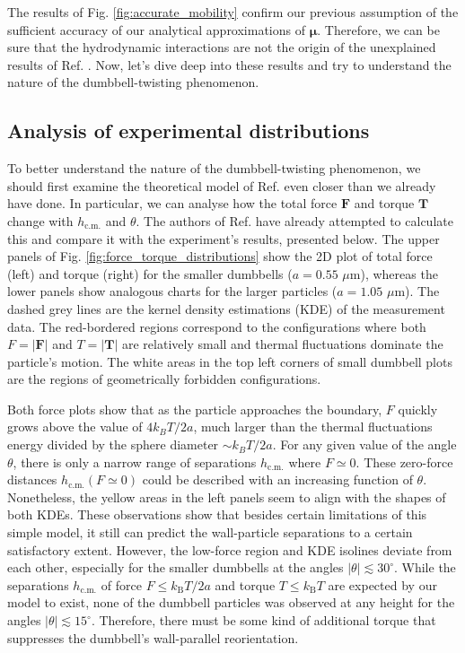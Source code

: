 \documentclass{master_thesis}
\begin{document}
The results of Fig. \ref{fig:accurate_mobility} confirm our previous assumption of the sufficient accuracy of our analytical approximations of $\boldsymbol{\mu}$. Therefore, we can be sure that the hydrodynamic interactions are not the origin of the unexplained results of Ref. \cite{verweij2021}. Now, let's dive deep into these results and try to understand the nature of the dumbbell-twisting phenomenon.

\subsection{Analysis of experimental distributions}

To better understand the nature of the dumbbell-twisting phenomenon, we should first examine the theoretical model of Ref. \cite{verweij2021} even closer than we already have done. In particular, we can analyse how the total force $\boldsymbol{F}$ and torque $\boldsymbol{T}$ change with $h_{\textrm{c.m.}}$ and $\theta$. The authors of Ref. \cite{verweij2021} have already attempted to calculate this and compare it with the experiment's results, presented below. The upper panels of Fig. \ref{fig:force_torque_distributions} show the 2D plot of total force (left) and torque (right) for the smaller dumbbells ($a=0.55$ $\mu$m), whereas the lower panels show analogous charts for the larger particles ($a=1.05$ $\mu$m). The dashed grey lines are the kernel density estimations (KDE) of the measurement data. The red-bordered regions correspond to the configurations where both $F=|\boldsymbol{F}|$ and $T=|\boldsymbol{T}|$ are relatively small and thermal fluctuations dominate the particle's motion. The white areas in the top left corners of small dumbbell plots are the regions of geometrically forbidden configurations. 

Both force plots show that as the particle approaches the boundary, $F$ quickly grows above the value of $4k_BT/2a$, much larger than the thermal fluctuations energy divided by the sphere diameter $\sim k_BT / 2a$. For any given value of the angle $\theta$, there is only a narrow range of separations $h_{\textrm{c.m.}}$ where $F \simeq 0$. These zero-force distances $h_{\textrm{c.m.}}(F \simeq 0)$ could be described with an increasing function of $\theta$. Nonetheless, the yellow areas in the left panels seem to align with the shapes of both KDEs. These observations show that besides certain limitations of this simple model, it still can predict the wall-particle separations to a certain satisfactory extent. However, the low-force region and KDE isolines deviate from each other, especially for the smaller dumbbells at the angles $|\theta|\lesssim 30^{\circ}$. While the separations $h_{\textrm{c.m.}}$ of force $F \leqslant k_{\textrm{B}}T / 2a$ and torque $T \leqslant k_{\textrm{B}}T$ are expected by our model to exist, none of the dumbbell particles was observed at any height for the angles $|\theta| \lesssim 15^{\circ}$. Therefore, there must be some kind of additional torque that suppresses the dumbbell's wall-parallel reorientation.
\end{document}
